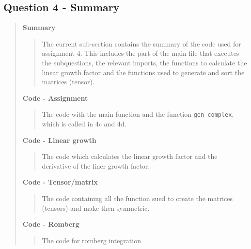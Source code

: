
\subsection*{\textbf{Question 4 - Summary}}
\begin{quote}

\textbf{Summary}
\begin{quote}
The current sub-section contains the summary of the code used for assignment 4. This includes the part of the main file that executes the subquestions, the relevant imports, the functions to calculate the linear growth factor and the functions used to generate and sort the matrices (tensor).

\end{quote}


\textbf{Code - Assignment}

\begin{quote}
The code with the main function and the function \texttt{gen\_complex}, which is called in 4c and 4d. 
\label{CODE:MAIN4}

\end{quote}

\textbf{Code - Linear growth} \\
\begin{quote}
The code which calculates the linear growth factor and the derivative of the liner growth factor.
\label{CODE:h4}

\end{quote}

\textbf{Code - Tensor/matrix}
\begin{quote}
The code containing all the function sued to create the matrices (tensors) and make then symmetric.  

\label{CODE:misc}
\end{quote}

\textbf{Code - Romberg}
\begin{quote}
The code for romberg integration

\label{CODE:misc}
\end{quote}


\end{quote}

\newpage

%

%


%
\newpage











